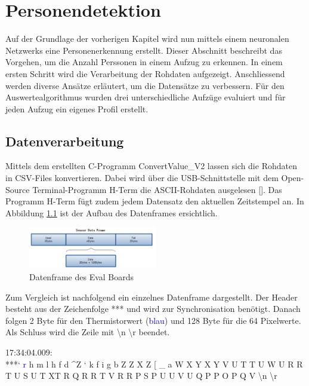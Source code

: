 \chapter{Personendetektion}
\label{chap:Personendetektion}

Auf der Grundlage der vorherigen Kapitel wird nun mittels einem neuronalen Netzwerks eine Personenerkennung erstellt. Dieser Abschnitt beschreibt das Vorgehen, um die Anzahl Perssonen in einem Aufzug zu erkennen. In einem ersten Schritt wird die Verarbeitung der Rohdaten aufgezeigt. Anschliessend werden diverse Ansätze erläutert, um die Datensätze zu verbessern. Für den Auswertealgorithmus wurden drei unterschiedliche Aufzüge evaluiert und für jeden Aufzug ein eigenes Profil erstellt. 

\section{Datenverarbeitung}
\label{Datenverarbeitung}

Mittels dem erstellten C-Programm ConvertValue\_V2 lassen sich die Rohdaten in \ac{CSV}-Files konvertieren. Dabei wird über die USB-Schnittstelle mit dem Open-Source Terminal-Programm H-Term die \ac{ASCII}-Rohdaten ausgelesen [\protect\cite{HTERM}].
Das Programm H-Term fügt zudem jedem Datensatz den aktuellen Zeitstempel an. In Abbildung \ref{fig:Dataframe} ist der Aufbau des Datenframes ersichtlich.

\begin{figure}[H]
	\centering
	\includegraphics[width=0.5\textwidth]
	{fig/Dataframe}
	\caption[Datenframe des Eval Boards]{Datenframe des Eval Boards}
	\label{fig:Dataframe}
\end{figure}

Zum Vergleich ist nachfolgend ein einzelnes Datenframe dargestellt. Der Header besteht aus der Zeichenfolge *** und wird zur Synchronisation benötigt. Danach folgen 2 Byte für den Thermistorwert (\textcolor{blue}{blau}) und 128 Byte für die 64 Pixelwerte. Als Schluss wird die Zeile mit \textbackslash n \textbackslash r beendet.

17:34:04.009: \\
***\textcolor{blue}{‘ r} h m l h f d \^ \space \space Z ` k f i g b Z Z X Z [ \_ a W X Y X Y V U T T U W U R R T U S U T XT R Q R R T V R R P S P U U V U Q P P O P Q V  \textbackslash n \textbackslash r \\

